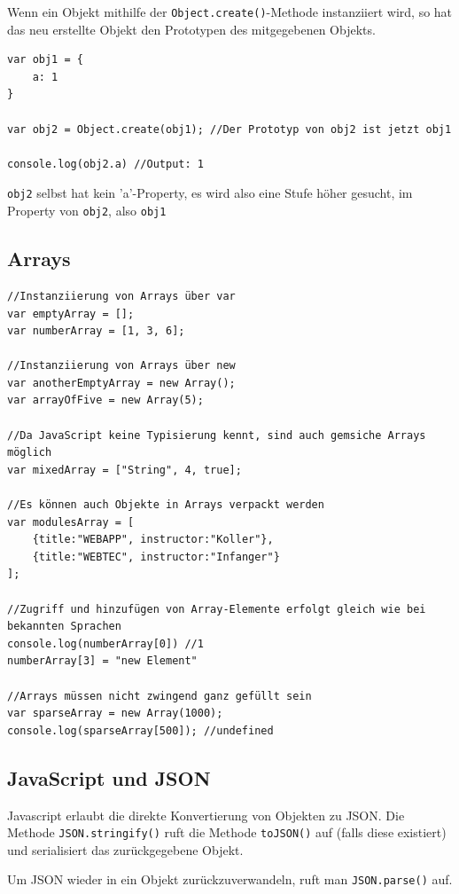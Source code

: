 \documentclass[a4paper, 11pt]{article}
\newcommand{\code}[1]{\texttt{#1}}
\begin{document}
Wenn ein Objekt mithilfe der \code{Object.create()}-Methode instanziiert wird, so hat das neu erstellte Objekt den Prototypen des mitgegebenen Objekts.

\begin{lstlisting}
var obj1 = {
	a: 1
}

var obj2 = Object.create(obj1); //Der Prototyp von obj2 ist jetzt obj1

console.log(obj2.a) //Output: 1
\end{lstlisting}

\code{obj2} selbst hat kein 'a'-Property, es wird also eine Stufe höher gesucht, im Property von \code{obj2}, also \code{obj1}

\subsection{Arrays}

\begin{lstlisting}
//Instanziierung von Arrays über var
var emptyArray = [];
var numberArray = [1, 3, 6];

//Instanziierung von Arrays über new
var anotherEmptyArray = new Array();
var arrayOfFive = new Array(5);

//Da JavaScript keine Typisierung kennt, sind auch gemsiche Arrays möglich
var mixedArray = ["String", 4, true];

//Es können auch Objekte in Arrays verpackt werden
var modulesArray = [
	{title:"WEBAPP", instructor:"Koller"}, 
	{title:"WEBTEC", instructor:"Infanger"}
];

//Zugriff und hinzufügen von Array-Elemente erfolgt gleich wie bei bekannten Sprachen
console.log(numberArray[0]) //1
numberArray[3] = "new Element"

//Arrays müssen nicht zwingend ganz gefüllt sein
var sparseArray = new Array(1000);
console.log(sparseArray[500]); //undefined
\end{lstlisting}

\subsection{JavaScript und JSON}
Javascript erlaubt die direkte Konvertierung von Objekten zu JSON. Die Methode \code{JSON.stringify()} ruft die Methode \code{toJSON()} auf (falls diese existiert) und serialisiert das zurückgegebene Objekt.

Um JSON wieder in ein Objekt zurückzuverwandeln, ruft man \code{JSON.parse()} auf.
\end{document}
